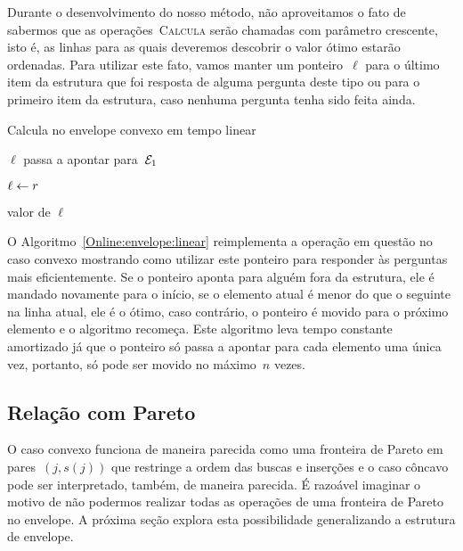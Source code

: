 Durante o desenvolvimento do nosso método, não aproveitamos o fato de sabermos que as operações~\textsc{Calcula} serão chamadas com parâmetro crescente, isto é, as linhas para as quais deveremos descobrir o valor ótimo estarão ordenadas. Para utilizar este fato, vamos manter um ponteiro~$\ell$ para o último item da estrutura que foi resposta de alguma pergunta deste tipo ou para o primeiro item da estrutura, caso nenhuma pergunta tenha sido feita ainda. 

\begin{algorithm}[h]
\caption{Calcula no envelope convexo em tempo linear}
\label{Online:envelope:linear}
\begin{algorithmic}[1]
        \State $\ell$ passa a apontar para~$\mathcal{E}_1$
    \EndIf
    
        \State $\ell \leftarrow r$
    \EndWhile

    \State \Return valor de $\ell$
\EndFunction
\end{algorithmic}
\end{algorithm}

O Algoritmo~\ref{Online:envelope:linear} reimplementa a operação em questão no caso convexo mostrando como utilizar este ponteiro para responder às perguntas mais eficientemente. Se o ponteiro aponta para alguém fora da estrutura, ele é mandado novamente para o início, se o elemento atual é menor do que o seguinte na linha atual, ele é o ótimo, caso contrário, o ponteiro é movido para o próximo elemento e o algoritmo recomeça. Este algoritmo leva tempo constante amortizado já que o ponteiro só passa a apontar para cada elemento uma única vez, portanto, só pode ser movido no máximo~$n$ vezes.


\subsection{Relação com Pareto}

O caso convexo funciona de maneira parecida como uma fronteira de Pareto em pares~$(j,s(j))$ que restringe a ordem das buscas e inserções e o caso côncavo pode ser interpretado, também, de maneira parecida. É razoável imaginar o motivo de não podermos realizar todas as operações de uma fronteira de Pareto no envelope. A próxima seção explora esta possibilidade generalizando a estrutura de envelope.
